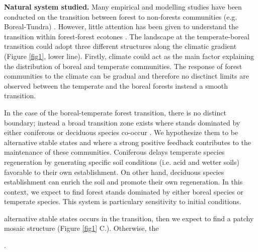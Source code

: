 \textbf{Natural system studied.} Many empirical and modelling studies have
been conducted on the transition between forest to non-forests communities
(e.g. Boreal-Tundra) \cite{Scheffer2012,Scheffer2001,Hirota2011,Messaoud2007}.
However, little attention has been given to understand the transition within
forest-forest ecotones \cite{Goldblum2010,Graignic2013,Messaoud2007}.  The
landscape at the temperate-boreal transition could adopt three different
structures along the climatic gradient (Figure \ref{fig1}, lower line).
Firstly, climate could act as the main factor explaining the distribution of
boreal and temperate communities. The response of forest communities to the
climate can be gradual and therefore no disctinct limits are observed between
the temperate and the boreal forests instead a smooth transition.


In the case of the boreal-temperate  forest transition, there is no distinct
boundary; instead a broad transition zone exists where stands dominated by
either coniferous or deciduous species co-occur
\cite{Goldblum2010,Fisichelli2013}.  We hypothesize them to be alternative
stable states and where a strong positive feedback contributes to the
maintenance of these communities. Coniferous delays temperate species
regeneration by generating specific soil conditions (i.e. acid and wetter
soils) favorable to their own establishment. On other hand, deciduous species
establishment can enrich the soil and promote their own regeneration. In this
context, we expect to find forest stands dominated by either boreal species or
temperate species. This system is particulary sensitivity to initial
conditions. 

 alternative stable states occurs in the
transition, then we expect to find a patchy mosaic structure (Figure
\ref{fig1} C.). Otherwise, the 

\cite{Kellman2004,Moore2008,Barras1998}.


